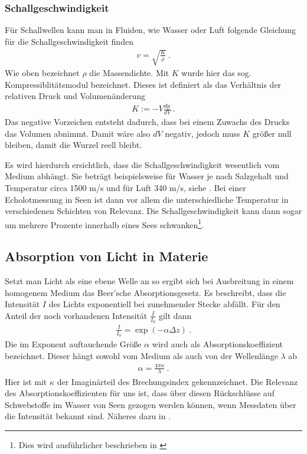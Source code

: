 \documentclass[12pt,a4paper,titlepage,headinclude,bibtotoc]{scrartcl}
\numberwithin{equation}{subsection}
\begin{document}
\subsubsection{Schallgeschwindigkeit}
\label{sec:theschallgeschw}
Für Schallwellen kann man in Fluiden, wie Wasser oder Luft folgende Gleichung für die Schallgeschwindigkeit finden
\begin{align}
 v = \sqrt{  \frac{K}{\rho}  }~.
\end{align}
Wie oben bezeichnet $\rho$ die Massendichte. Mit $K$ wurde hier das sog. Kompressiblitätsmodul bezeichnet. Dieses ist definiert als das Verhältnis der relativen Druck und Volumenänderung
\begin{align}
 K := - V \frac{d p}{d V} ~.
\end{align}
Das negative Vorzeichen entsteht dadurch, dass bei einem Zuwachs des Drucks das Volumen abnimmt. Damit wäre also $dV$ negativ, jedoch muss $K$ größer null bleiben, damit die Wurzel reell bleibt.


Es wird hierdurch ersichtlich, dass die Schallgeschwindigkeit wesentlich vom Medium abhängt. 
Sie beträgt beispielsweise für Wasser je nach Salzgehalt und Temperatur circa 1500 m/s  und für Luft 340 m/s, siehe \cite[S.467]{tipler}.
Bei einer Echolotmessung in Seen ist dann vor allem die unterschiedliche Temperatur in verschiedenen Schichten 
von Relevanz. Die Schallgeschwindigkeit kann dann sogar um mehrere Prozente innerhalb eines Sees schwanken\footnote{Dies wird ausführlicher beschrieben in \cite{schicht}}.



\subsection{Absorption von Licht in Materie}
Setzt man Licht als eine ebene Welle an so ergibt sich bei Ausbreitung in einem homogenem Medium das Beer'sche Absorptionsgesetz.
Es beschreibt, dass die Intensität $I$ des Lichts exponentiell bei zunehmender Stecke abfällt.
Für den Anteil der noch vorhandenen Intensität $\frac{I}{I_0}$ gilt dann
\begin{align}
 \frac{I}{I_0}  =  \exp(- \alpha  \Delta z)~.\label{eq:absorblicht}
\end{align}
Die im Exponent auftauchende Größe $\alpha$ wird auch als Absorptionskoeffizient bezeichnet. Dieser hängt sowohl vom Medium als auch von der Wellenlänge $\lambda$ ab
\begin{align}
 \alpha= \frac{4 \pi \kappa}{\lambda}~.
\end{align}
Hier ist mit $\kappa$ der Imaginärteil des Brechungsindex gekennzeichnet.
Die Relevanz des Absorptionskoeffizienten für uns ist, dass über diesen Rückschlüsse auf Schwebstoffe im Wasser von Seen gezogen werden können, wenn Messdaten über die Intensität bekannt sind. Näheres dazu in 
\cite[S.229]{meschede}.
\end{document}
